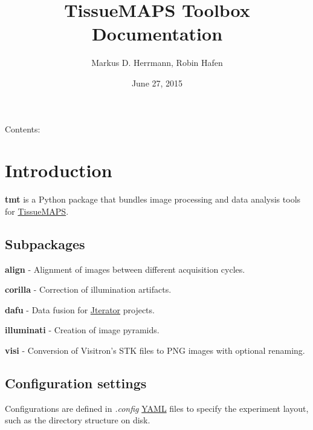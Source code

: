 \documentclass[letterpaper,10pt,english]{sphinxmanual}
\title{TissueMAPS Toolbox Documentation}
\date{June 27, 2015}
\author{Markus D. Herrmann, Robin Hafen}
\begin{document}
\maketitle
\tableofcontents
{}\label{index::doc}


Contents:


\chapter{Introduction}
\label{intro:introduction}\label{intro:welcome-to-tissuemaps-toolbox-s-documentation}\label{intro::doc}\label{intro:id1}
\textbf{tmt} is a Python package that bundles image processing and data analysis tools for \href{https://github.com/HackerMD/TissueMAPS}{TissueMAPS}.


\section{Subpackages}
\label{intro:subpackages}\label{intro:id2}
\textbf{align} - Alignment of images between different acquisition cycles.

\textbf{corilla} - Correction of illumination artifacts.

\textbf{dafu} - Data fusion for \href{https://github.com/HackerMD/Jterator}{Jterator} projects.

\textbf{illuminati} - Creation of image pyramids.

\textbf{visi} - Conversion of Visitron's STK files to PNG images with optional renaming.


\section{Configuration settings}
\label{intro:configurationsettings}\label{intro:configuration-settings}
Configurations are defined in \emph{.config} \href{http://yaml.org/}{YAML} files to specify the experiment layout, such as the directory structure on disk.
\end{document}
